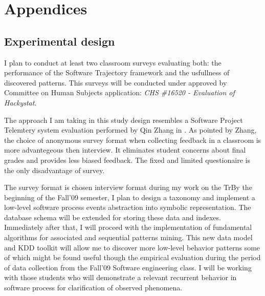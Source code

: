 \chapter{Appendices} \label{appendix}

\section{Experimental design} \label{survey}
I plan to conduct at least two classroom surveys evaluating both: the performance of the Software Trajectory framework and the usfullness of discovered patterns. This surveys will be conducted under approved by Committee on Human Subjects application: \textit{CHS \#16520 - Evaluation of Hackystat}.

The approach I am taking in this study design resembles a Software Project Telemtery system evaluation performed by Qin Zhang in \cite{csdl2-06-05}. As pointed by Zhang, the choice of anonymous survey format when collecting feedback in a classroom is more advantegeous then interview. It eliminates student concerns about final grades and provides less biased feedback. The fixed and limited questionaire is the only disadvantage of survey. 


The survey format is chosen interview format during my work on the TrBy the beginning of the Fall'09 semester, I plan to design a taxonomy and implement a low-level software process events abstraction into symbolic representation. The database schema will be extended for storing these data and indexes. Immediately after that, I will proceed with the implementation of fundamental algorithms for associated and sequential patterns mining. This new data model and KDD toolkit will allow me to discover more low-level behavior patterns some of which might be found useful though the empirical evaluation during the period of data collection from the Fall'09 Software engineering class. I will be working with those students who will demonstrate a relevant recurrent behavior in software process for clarification of observed phenomena.

\newpage
